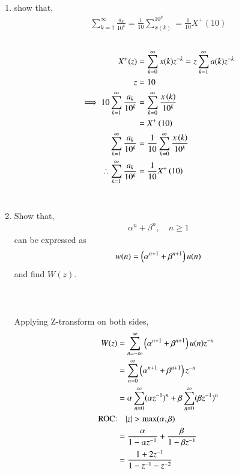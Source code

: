 \documentclass[journal,12pt,twocolumn]{IEEEtran}
\renewcommand\thesection{\arabic{section}}
\begin{document}
\begin{enumerate}[label=\thesection.\arabic*,ref=\thesection.\theenumi]
	\item 
		show that,
		\begin{align}
			\sum_{k=1}^{\infty}\frac{a_k}{10^k} = \frac{1}{10}\sum_{x(k)}^{10^k} = \frac{1}{10}X^+(10)
		\end{align}
	\solution\\
		\begin{align}
			X^{+}(z) & =\sum_{k=0}^{\infty} x(k)z^{-k}=z\sum_{k=1}^{\infty} a(k) z^{-k}\\
			z & =10\\
			\implies 10\sum_{k=1}^{\infty}\frac{a_k}{10^k} & =\sum_{k=0}^{\infty}\frac{x\left(k\right)}{10^k}\\ & =X^{+}\left({10}\right)\\
			\sum_{k=1}^{\infty}\frac{a_k}{10^k} & = \frac{1}{10}\sum_{k=0}^{\infty}\frac{x\left(k\right)}{10^k}\\
			\therefore \sum_{k=1}^{\infty}\frac{a_k}{10^k} & = \frac{1}{10}X^{+}\left({10}\right)
		\end{align}\\
	
	\item 
		Show that,
		\begin{align}
			\alpha^n + \beta^n, \quad n \ge 1
		\end{align}
		can be expressed as
		\begin{align}
			w(n) =\left(\alpha^{n+1} + \beta^{n+1}\right)u(n)
		\end{align}
		and find $W(z)$.\\ \ \\
	\solution\\ \ \\
		Applying Z-transform on both sides,
		\begin{align}
			W(z)&=\sum_{n=-\infty}^{\infty}\brak{\alpha^{n+1} + \beta^{n+1}}u(n)z^{-n}\\
			&=\sum_{n=0}^{\infty}\brak{\alpha^{n+1} + \beta^{n+1}}z^{-n}\\
			&=\alpha \sum_{n=0}^{\infty}(\alpha z^{-1})^{n}+\beta \sum_{n=0}^{\infty} (\beta z^{-1})^{n}\\
			\text{ROC:} & \quad |z|>\text{max}(\alpha,\beta) \nonumber \\
			&=\frac{\alpha}{1-\alpha z^{-1}}+\frac{\beta}{1-\beta z^{-1}}\\
			&=\frac{1+2z^{-1}}{1-z^{-1}-z^{-2}}
		\end{align}


\end{enumerate}
\end{document}
